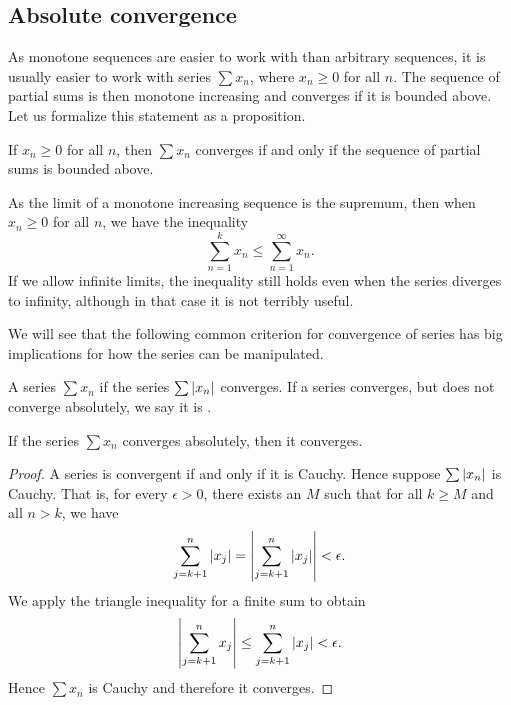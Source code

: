 \subsection{Absolute convergence}

As monotone sequences are easier to work with than arbitrary sequences, it
is usually easier to work with series $\sum x_n$, where $x_n \geq 0$ for
all $n$.  The sequence of partial sums is then monotone increasing
and converges if it is bounded above.
Let us formalize this statement as a proposition.

\begin{prop}
If $x_n \geq 0$ for all $n$, then $\sum x_n$ converges if and only if
the sequence of partial sums is bounded above.
\end{prop}

As the limit of a monotone increasing sequence is the supremum, then
when $x_n \geq 0$ for all $n$, we have the
inequality
\begin{equation*}
\sum_{n=1}^k x_n \leq
\sum_{n=1}^\infty x_n .
\end{equation*}
If we allow infinite limits, the inequality still
holds even when the series diverges to infinity, although in that case it is not
terribly useful.

We will see that the following common criterion for convergence of series 
has big implications for how the series can be manipulated.

\begin{defn}
A series $\sum x_n$
\emph{} if
the series $\sum \left\lvert {x_n} \right\rvert$ converges.
If a series converges, but does not converge absolutely, we say
it is \emph{}.
\end{defn}

\begin{prop}
If the series $\sum x_n$ converges absolutely, then it converges.
\end{prop}

\begin{proof}
A series is convergent if and only if it is Cauchy.  Hence
suppose $\sum \left\lvert {x_n} \right\rvert$ is Cauchy.  That is, for every $\epsilon > 0$,
there exists an $M$ such that for all $k \geq M$ and all $n > k$, we have 
\begin{equation*}
\sum_{j=k+1}^n \left\lvert {x_j} \right\rvert 
=
\left\lvert { \sum_{j=k+1}^n \left\lvert {x_j} \right\rvert } \right\rvert
<
\epsilon .
\end{equation*}
We apply the triangle inequality for a finite sum to obtain
\begin{equation*}
\left\lvert { \sum_{j=k+1}^n x_j } \right\rvert
\leq
\sum_{j=k+1}^n \left\lvert {x_j} \right\rvert
<
\epsilon .
\end{equation*}
Hence $\sum x_n$ is Cauchy and therefore it converges.
\end{proof}

